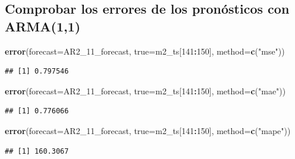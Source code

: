 \documentclass[
  11pt,
]{article}
\newenvironment{Shaded}{\begin{snugshade}}{\end{snugshade}}
\newcommand{\DataTypeTok}[1]{\textcolor[rgb]{0.13,0.29,0.53}{#1}}
\newcommand{\DecValTok}[1]{\textcolor[rgb]{0.00,0.00,0.81}{#1}}
\newcommand{\KeywordTok}[1]{\textcolor[rgb]{0.13,0.29,0.53}{\textbf{#1}}}
\newcommand{\NormalTok}[1]{#1}
\newcommand{\OperatorTok}[1]{\textcolor[rgb]{0.81,0.36,0.00}{\textbf{#1}}}
\newcommand{\StringTok}[1]{\textcolor[rgb]{0.31,0.60,0.02}{#1}}
\begin{document}
\hypertarget{comprobar-los-errores-de-los-pronuxf3sticos-con-arma11}{%
\subsection{Comprobar los errores de los pronósticos con
ARMA(1,1)}\label{comprobar-los-errores-de-los-pronuxf3sticos-con-arma11}}

\begin{Shaded}
\begin{Highlighting}[]
\KeywordTok{error}\NormalTok{(}\DataTypeTok{forecast=}\NormalTok{AR2_}\DecValTok{11}\NormalTok{_forecast, }\DataTypeTok{true=}\NormalTok{m2_ts[}\DecValTok{141}\OperatorTok{:}\DecValTok{150}\NormalTok{], }\DataTypeTok{method=}\KeywordTok{c}\NormalTok{(}\StringTok{"mse"}\NormalTok{))}
\end{Highlighting}
\end{Shaded}

\begin{verbatim}
## [1] 0.797546
\end{verbatim}

\begin{Shaded}
\begin{Highlighting}[]
\KeywordTok{error}\NormalTok{(}\DataTypeTok{forecast=}\NormalTok{AR2_}\DecValTok{11}\NormalTok{_forecast, }\DataTypeTok{true=}\NormalTok{m2_ts[}\DecValTok{141}\OperatorTok{:}\DecValTok{150}\NormalTok{], }\DataTypeTok{method=}\KeywordTok{c}\NormalTok{(}\StringTok{"mae"}\NormalTok{))}
\end{Highlighting}
\end{Shaded}

\begin{verbatim}
## [1] 0.776066
\end{verbatim}

\begin{Shaded}
\begin{Highlighting}[]
\KeywordTok{error}\NormalTok{(}\DataTypeTok{forecast=}\NormalTok{AR2_}\DecValTok{11}\NormalTok{_forecast, }\DataTypeTok{true=}\NormalTok{m2_ts[}\DecValTok{141}\OperatorTok{:}\DecValTok{150}\NormalTok{], }\DataTypeTok{method=}\KeywordTok{c}\NormalTok{(}\StringTok{"mape"}\NormalTok{))}
\end{Highlighting}
\end{Shaded}

\begin{verbatim}
## [1] 160.3067
\end{verbatim}
\end{document}
